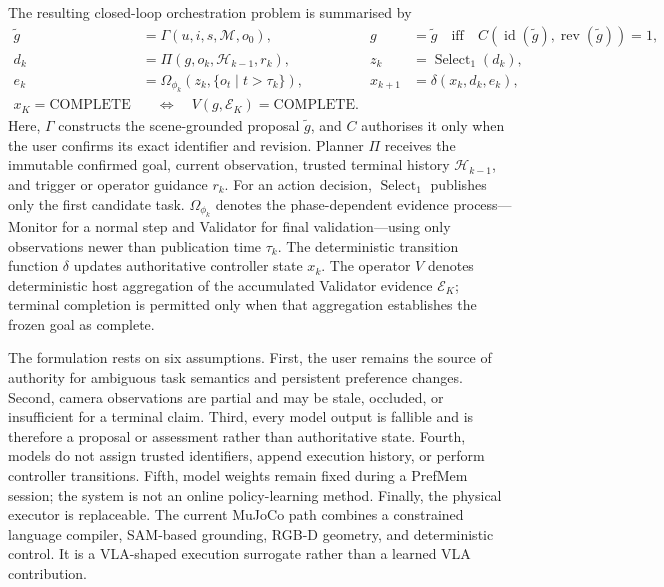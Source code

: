 \documentclass{article}
\begin{document}
The resulting closed-loop orchestration problem is summarised by
\begin{equation}
\label{eq:prefmem-closed-loop}
\begin{aligned}
    \tilde{g}
        &= \Gamma(u,i,s,\mathcal{M},o_0),
    &
    g
        &= \tilde{g}
        \quad \text{iff} \quad
        C\!\left(\operatorname{id}(\tilde{g}),
        \operatorname{rev}(\tilde{g})\right)=1,
        \\
    d_k
        &= \Pi\!\left(g,o_k,\mathcal{H}_{k-1},r_k\right),
    &
    z_k
        &= \operatorname{Select}_1(d_k),
        \\
    e_k
        &= \Omega_{\phi_k}\!\left(
        z_k,\{o_t\mid t>\tau_k\}\right),
    &
    x_{k+1}
        &= \delta(x_k,d_k,e_k),
        \\
    x_K=\mathrm{COMPLETE}
        &\quad \Longleftrightarrow \quad
        V(g,\mathcal{E}_K)=\mathrm{COMPLETE}.&&
\end{aligned}
\end{equation}
Here, \(\Gamma\) constructs the scene-grounded proposal \(\tilde{g}\), and
\(C\) authorises it only when the user confirms its exact identifier and
revision. Planner \(\Pi\) receives the immutable confirmed goal, current
observation, trusted terminal history \(\mathcal{H}_{k-1}\), and trigger or
operator guidance \(r_k\). For an action decision,
\(\operatorname{Select}_1\) publishes only the first candidate task.
\(\Omega_{\phi_k}\) denotes the phase-dependent evidence process---Monitor for
a normal step and Validator for final validation---using only observations
newer than publication time \(\tau_k\). The deterministic transition function
\(\delta\) updates authoritative controller state \(x_k\). The operator \(V\)
denotes deterministic host aggregation of the accumulated Validator evidence
\(\mathcal{E}_K\); terminal completion is permitted only when that aggregation
establishes the frozen goal as complete.

The formulation rests on six assumptions. First, the user remains the source
of authority for ambiguous task semantics and persistent preference changes.
Second, camera observations are partial and may be stale, occluded, or
insufficient for a terminal claim. Third, every model output is fallible and is
therefore a proposal or assessment rather than authoritative state. Fourth,
models do not assign trusted identifiers, append execution history, or perform
controller transitions. Fifth, model weights remain fixed during a PrefMem
session; the system is not an online policy-learning method. Finally, the
physical executor is replaceable. The current MuJoCo path combines a
constrained language compiler, SAM-based grounding, RGB-D geometry, and
deterministic control. It is a VLA-shaped execution surrogate rather than a
learned VLA contribution.
\end{document}
